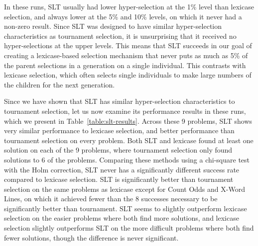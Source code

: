 \documentclass{sig-alternate}
\begin{document}
In these runs, SLT usually had lower hyper-selection at the 1\% level than lexicase selection, and always lower at the 5\% and 10\% levels, on which it never had a non-zero result. Since SLT was designed to have similar hyper-selection characteristics as tournament selection, it is unsurprising that it received no hyper-selections at the upper levels. This means that SLT succeeds in our goal of creating a lexicase-based selection mechanism that never puts as much as 5\% of the parent selections in a generation on a single individual. This contrasts with lexicase selection, which often selects single individuals to make large numbers of the children for the next generation.

Since we have shown that SLT has similar hyper-selection characteristics to tournament selection, let us now examine its performance results in these runs, which we present in Table~\ref{table:slt-results}. Across these 9 problems, SLT shows very similar performance to lexicase selection, and better performance than tournament selection on every problem. Both SLT and lexicase found at least one solution on each of the 9 problems, where tournament selection only found solutions to 6 of the problems. Comparing these methods using a chi-square test with the Holm correction, SLT never has a significantly different success rate compared to lexicase selection. SLT is significantly better than tournament selection on the same problems as lexicase except for Count Odds and X-Word Lines, on which it achieved fewer than the 8 successes necessary to be significantly better than tournament.
 SLT seems to slightly outperform lexicase selection on the easier problems where both find more solutions, and lexicase selection slightly outperforms SLT on the more difficult problems where both find fewer solutions, though the difference is never significant.

\end{document}
